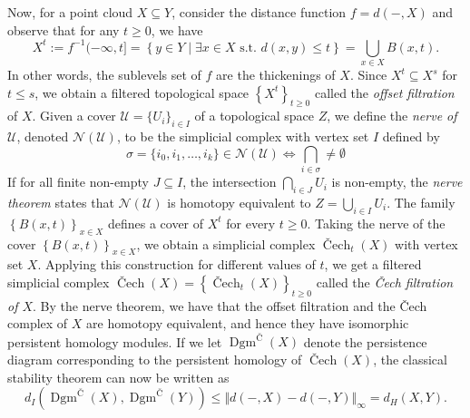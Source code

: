 \documentclass[10pt,a4paper]{article}
\theoremstyle{definition}
\begin{document}
Now, for a point cloud $X\subseteq Y$, consider the distance function $f=d(-,X)$ and observe that for any $t\geq 0$, we have
$$
X^t := f^{-1}(-\infty, t] = \left\{y\in Y\mid\exists x\in X\text{ s.t. }d(x,y)\leq t\right\} = \bigcup_{x\in X}B(x,t).
$$
In other words, the sublevels set of $f$ are the thickenings of $X$. Since $X^t\subseteq X^s$ for $t\leq s$, we obtain a filtered topological space $\left\{X^t\right\}_{t\geq 0}$ called the \textit{offset filtration} of $X$. Given a cover $\mathcal{U}=\{U_i\}_{i\in I}$ of a topological space $Z$, we define the \textit{nerve of $\mathcal{U}$}, denoted $\mathcal{N}(\mathcal{U})$, to be the simplicial complex with vertex set $I$ defined by
$$
\sigma = \{i_0, i_1, \ldots, i_k\}\in\mathcal{N}(\mathcal{U})\iff \bigcap_{i\in\sigma}\neq\emptyset
$$
If for all finite non-empty $J\subseteq I$, the intersection $\bigcap_{i\in J} U_i$ is non-empty, the \textit{nerve theorem} states that $\mathcal{N}(\mathcal{U})$ is homotopy equivalent to $Z=\bigcup_{i\in I}U_i$. The family $\left\{B(x,t)\right\}_{x\in X}$ defines a cover of $X^t$ for every $t\geq 0$. Taking the nerve of the cover $\left\{B(x,t)\right\}_{x\in X}$, we obtain a simplicial complex $\operatorname{\text{\v{C}ech}}_t(X)$ with vertex set $X$. Applying this construction for different values of $t$, we get a filtered simplicial complex $\operatorname{\text{\v{C}ech}}(X) =\left\{ \operatorname{\text{\v{C}ech}}_t(X)\right\}_{t\geq 0}$ called the \textit{Čech filtration of $X$}. By the nerve theorem, we have that the offset filtration and the Čech complex of $X$ are homotopy equivalent, and hence they have isomorphic persistent homology modules. If we let $\operatorname{Dgm}^{\text{Č}}(X)$ denote the persistence diagram corresponding to the persistent homology of $\operatorname{\text{\v{C}ech}}(X)$, the classical stability theorem can now be written as 
$$
d_I(\operatorname{Dgm}^{\text{Č}}(X), \operatorname{Dgm}^{\text{Č}}(Y))\leq\Vert d(-,X) - d(-, Y)\Vert_\infty = d_H(X,Y).
$$
\end{document}
